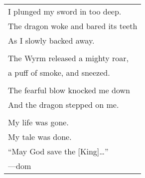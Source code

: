\documentclass{article}
\begin{document}
\begin{center}
\begin{tabular}{l}
\\
I plunged my sword in too deep. \\
The dragon woke and bared its teeth \\
As I slowly backed away. \\
\\
The Wyrm released a mighty roar, \\
a puff of smoke, and sneezed. \\
\\
The fearful blow knocked me down \\
And the dragon stepped on me. \\
\\
My life was gone. \\
My tale was done. \\
``May God save the [King]\ldots{}'' \\
---dom \\
\end{tabular}
\end{center}
\end{document}
